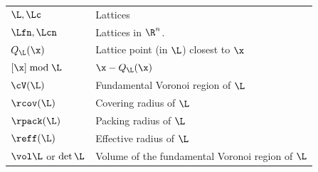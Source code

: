 \documentclass[main.tex]{subfiles}
\begin{document}
\begin{center}
 \begin{tabular}{|>{\centering}p{3cm}|p{11cm}|}
      \multicolumn{2}{c}{{\bf Lattices}}\\ \hline
      $\L,\Lc$ & Lattices\\
      $\Lfn,\Lcn$ & Lattices in $\R^n$.\\
      $Q_{\L}(\x)$ & Lattice point (in $\L$) closest to $\x$\\
      $[\x]\bmod\L$ & $\x-Q_{\L}(\x)$\\
      $\cV(\L)$ & Fundamental Voronoi region of $\L$\\
      $\rcov(\L)$ & Covering radius of $\L$\\
      $\rpack(\L)$ & Packing radius of $\L$\\
      $\reff(\L)$ & Effective radius of $\L$\\
      $\vol\L$ or $\det\L$ & Volume of the fundamental Voronoi region of $\L$\\
\hline
\end{tabular}
\end{center}
   
   
\end{document}
